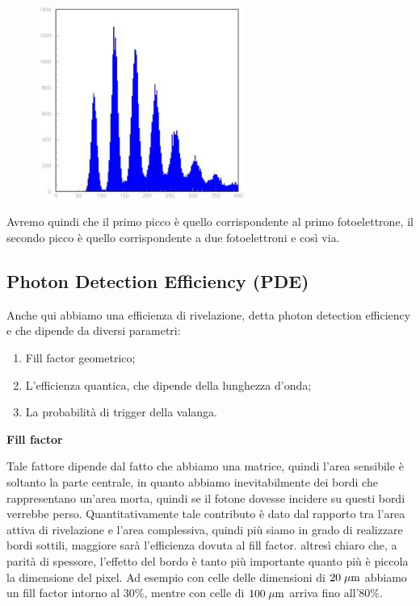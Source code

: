 \begin{figure}[H]
   \centering
   \includegraphics[width=0.6\textwidth]{immagini/spettro_SiPM.png}
\end{figure}

Avremo quindi che il primo picco è quello corrispondente al primo fotoelettrone, il secondo picco è quello corrispondente a due fotoelettroni e così via.

\subsection{Photon Detection Efficiency (PDE)}
Anche qui abbiamo una efficienza di rivelazione, detta photon detection efficiency e che dipende da diversi parametri:
\begin{enumerate}
   \item Fill factor geometrico;
   \item L'efficienza quantica, che dipende della lunghezza d'onda;
   \item La probabilità di trigger della valanga.
\end{enumerate}

\textbf{Fill factor}

Tale fattore dipende dal fatto che abbiamo una matrice, quindi l'area sensibile è soltanto la parte centrale, in quanto abbiamo inevitabilmente dei bordi che rappresentano un'area morta, quindi se il fotone dovesse incidere su questi bordi verrebbe perso. Quantitativamente tale contributo è dato dal rapporto tra l'area attiva di rivelazione e l'area complessiva, quindi più siamo in grado di realizzare bordi sottili, maggiore sarà l'efficienza dovuta al fill factor. \E altresì chiaro che, a parità di spessore, l'effetto del bordo è tanto più importante quanto più è piccola la dimensione del pixel. Ad esempio con celle delle dimensioni di $20 \; \rm \mu m$ abbiamo un fill factor intorno al 30\%, mentre con celle di $100 \; \rm \mu m$ arriva fino all'80\%.

